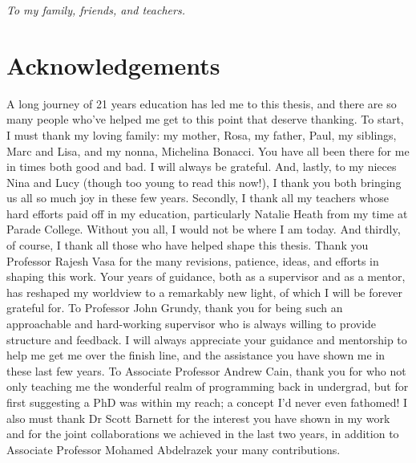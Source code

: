 \thispagestyle{empty}
\begin{center}
  \vspace*{0.3\paperheight}
  \textit{To my family, friends, and teachers.}
\end{center}

\cleardoublepage
{}
{}
\chapter*{Acknowledgements}

\vspace{-6\bigskipamount}

A long journey of 21 years education has led me to this thesis, and there are so many people who've helped me get to this point that deserve thanking. 
To start, I must thank my loving family: my mother, Rosa, my father, Paul, my siblings, Marc and Lisa, and my nonna, Michelina Bonacci. You have all been there for me in times both good and bad. I will always be grateful. And, lastly, to my nieces Nina and Lucy (though too young to read this now!), I thank you both bringing us all so much joy in these few years.
Secondly, I thank all my teachers whose hard efforts paid off in my education, particularly Natalie Heath from my time at Parade College. Without you all, I would not be where I am today.
And thirdly, of course, I thank all those who have helped shape this thesis. Thank you Professor Rajesh Vasa for the many revisions, patience, ideas, and efforts in shaping this work. Your years of guidance, both as a supervisor and as a mentor, has reshaped my worldview to a remarkably new light, of which I will be forever grateful for. 
To Professor John Grundy, thank you for being such an approachable and hard-working supervisor who is always willing to provide structure and feedback. I will always appreciate your guidance and mentorship to help me get me over the finish line, and the assistance you have shown me in these last few years.
To Associate Professor Andrew Cain, thank you for who not only teaching me the wonderful realm of programming back in undergrad, but for first suggesting a PhD was within my reach; a concept I'd never even fathomed!
I also must thank Dr Scott Barnett for the interest you have shown in my work and for the joint collaborations we achieved in the last two years, in addition to Associate Professor Mohamed Abdelrazek your many contributions. 
